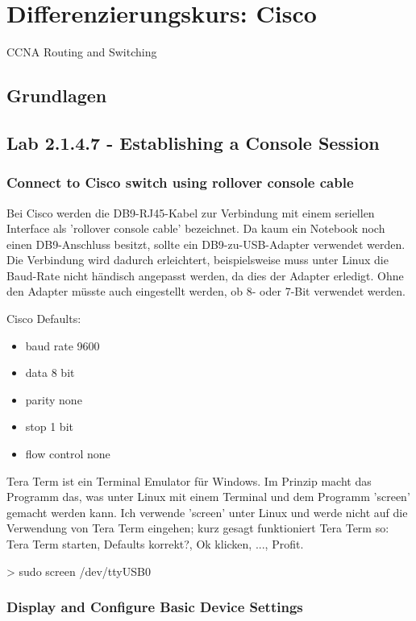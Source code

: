 \section{Differenzierungskurs: Cisco}

CCNA Routing and Switching

\subsection{Grundlagen}

\subsection{Lab 2.1.4.7 - Establishing a Console Session}

\subsubsection{Connect to Cisco switch using rollover console cable}
Bei Cisco werden die DB9-RJ45-Kabel zur Verbindung mit einem seriellen Interface als 'rollover console cable' bezeichnet. Da kaum ein Notebook noch einen DB9-Anschluss besitzt, sollte ein DB9-zu-USB-Adapter verwendet werden. Die Verbindung wird dadurch erleichtert, beispielsweise muss unter Linux die Baud-Rate nicht händisch angepasst werden, da dies der Adapter erledigt. Ohne den Adapter müsste auch eingestellt werden, ob 8- oder 7-Bit verwendet werden.

Cisco Defaults:
\begin{itemize}
	\item baud rate	9600
	\item data		8 bit
	\item parity		none
	\item stop		1 bit
	\item flow control	none
\end{itemize}

Tera Term ist ein Terminal Emulator für Windows. Im Prinzip macht das Programm das, was unter Linux mit einem Terminal und dem Programm 'screen' gemacht werden kann. Ich verwende 'screen' unter Linux und werde nicht auf die Verwendung von Tera Term eingehen; kurz gesagt funktioniert Tera Term so: \ql Tera Term starten, Defaults korrekt?, Ok klicken, ..., Profit.\qr

	> sudo screen /dev/ttyUSB0
\subsubsection{Display and Configure Basic Device Settings}
